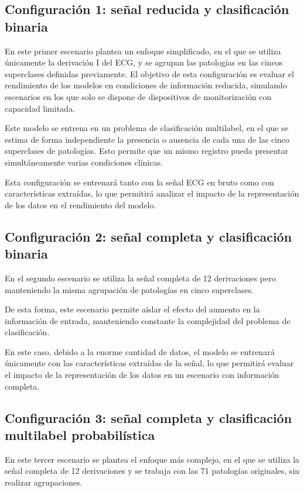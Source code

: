 \documentclass[12pt,a4paper,twoside]{book}
\begin{document}
\subsection{Configuración 1: señal reducida y clasificación binaria}

En este primer escenario plantea un enfoque simplificado, en el que se utiliza únicamente la derivación I del ECG, y se agrupan las patologías en las cincos superclases definidas previamente.
El objetivo de esta configuración es evaluar el rendimiento de los modelos en condiciones de información reducida, simulando escenarios en los que solo se dispone de dispositivos de monitorización con capacidad limitada.

Este modelo se entrena en un problema de clasificación multilabel, en el que se estima de forma independiente la presencia o ausencia de cada una de las cinco superclases de patologías. 
Esto permite que un mismo registro pueda presentar simultáneamente varias condiciones clínicas.

Esta configuración se entrenará tanto con la señal ECG en bruto como con características extraídas, lo que permitirá analizar el impacto de la representación de los datos en el rendimiento del modelo.

\subsection{Configuración 2: señal completa y clasificación binaria}

En el segundo escenario se utiliza la señal completa de 12 derivaciones pero manteniendo la misma agrupación de patologías en cinco superclases.

De esta forma, este escenario permite aislar el efecto del aumento en la información de entrada, manteniendo constante la complejidad del problema de clasificación.

En este caso, debido a la enorme cantidad de datos, el modelo se entrenará únicamente con las características extraídas de la señal, lo que permitirá evaluar el impacto de la representación de los datos en un escenario con información completa.

\subsection{Configuración 3: señal completa y clasificación multilabel probabilística}

En este tercer escenario se plantea el enfoque más complejo, en el que se utiliza la señal completa de 12 derivaciones y se trabaja con las 71 patologías originales, sin realizar agrupaciones.
\end{document}
